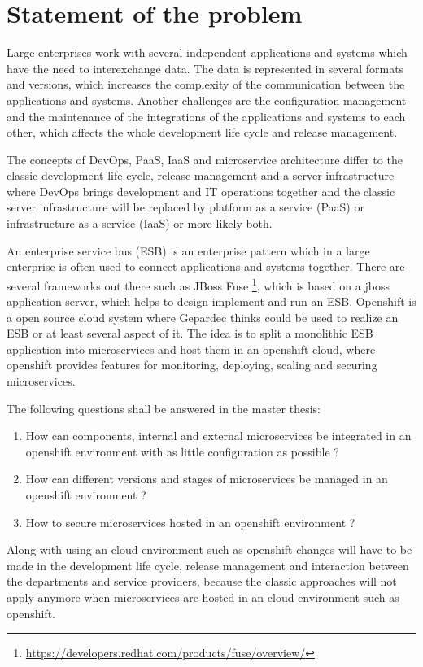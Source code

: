 \section{Statement of the problem}
\label{sec:statement-of-the-problem}
Large enterprises work with several independent applications and systems which have the need to interexchange data. The data is represented in several formats and versions, which increases the complexity of the communication between the applications and systems. Another challenges are the configuration management and the maintenance of the integrations of the applications and systems to each other, which affects the whole development life cycle and release management.

The concepts of DevOps, PaaS, IaaS and microservice architecture differ to the classic development life cycle, release management and a server infrastructure where DevOps brings development and IT operations together and the classic server infrastructure will be replaced by platform as a service (PaaS) or infrastructure as a service (IaaS) or more likely both. 

An enterprise service bus (ESB) is an enterprise pattern which in a large enterprise is often used to connect applications and systems together. There are several frameworks out there such as JBoss Fuse \footnote{\url{https://developers.redhat.com/products/fuse/overview/}}, which is based on a jboss application server, which helps to design implement and run an ESB. Openshift is a open source cloud system where Gepardec thinks could be used to realize an ESB or at least several aspect of it. The idea is to split a monolithic ESB application into microservices and host them in an openshift cloud, where openshift provides features for monitoring, deploying, scaling and securing microservices.

The following questions shall be answered in the master thesis:
\begin{enumerate}
	\item How can components, internal and external microservices be integrated in an openshift environment with as little configuration as possible ?
	\item How can different versions and stages of microservices be managed in an openshift environment ?
	\item How to secure microservices hosted in an openshift environment ?
\end{enumerate}
Along with using an cloud environment such as openshift changes will have to be made in the development life cycle, release management and interaction between the departments and service providers, because the classic approaches will not apply anymore when microservices are hosted in an cloud environment such as openshift.

